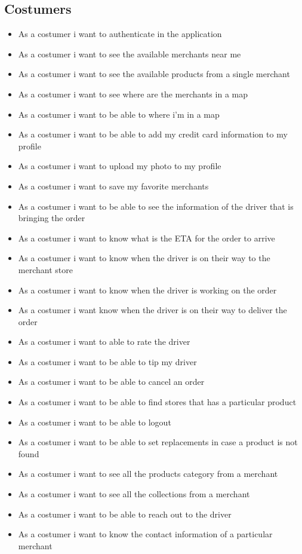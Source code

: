 \subsection{Costumers}
\begin{itemize}
    \item As a costumer i want to authenticate in the application
    \item As a costumer i want to see the available merchants near me
    \item As a costumer i want to see the available products from a single 
    merchant
    \item As a costumer i want to see where are the merchants in a map
    \item As a costumer i want to be able to where i’m in a map
    \item As a costumer i want to be able to add my credit card information 
    to my profile
    \item As a costumer i want to upload my photo to my profile
    \item As a costumer i want to save my favorite merchants
    \pagebreak
    \item As a costumer i want to be able to see the information of the driver 
    that is bringing the order
    \item As a costumer i want to know what is the ETA for the order to arrive
    \item As a costumer i want to know when the driver is on their way to the 
    merchant store
    \item As a costumer i want to know when the driver is working on the order
    \item As a costumer i want know when the driver is on their way to deliver 
    the order
    \item As a costumer i want to able to rate the driver
    \item As a costumer i want to be able to tip my driver
    \item As a costumer i want to be able to cancel an order
    \item As a costumer i want to be able to find stores that has a particular 
    product
    \item As a costumer i want to be able to logout
    \item As a costumer i want to be able to set replacements in case a 
    product is not found
    \item As a costumer i want to see all the products category from a merchant
    \item As a costumer i want to see all the collections from a merchant
    \item As a costumer i want to be able to reach out to the driver
    \item As a costumer i want to know the contact information of a 
    particular merchant
\end{itemize}
